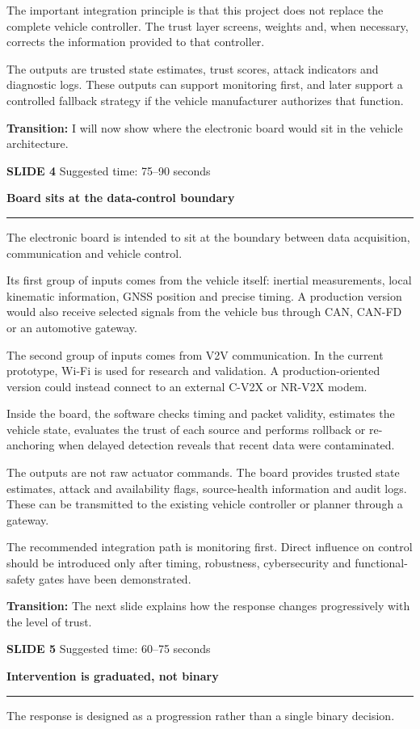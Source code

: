 \documentclass[11pt,a4paper]{article}
\newcommand{\slidetitle}[3]{%
  \clearpage
  {\color{Accent}\large\bfseries SLIDE #1}\hfill
  {\color{Muted}\small Suggested time: #3}\par
  \vspace{0.18cm}
  {\LARGE\bfseries #2}\par
  \vspace{0.20cm}
  {\color{Muted}\rule{\textwidth}{0.5pt}}\par
  \vspace{0.12cm}
}
\newcommand{\transition}[1]{%
  \vfill
  \colorbox{Panel}{%
    \parbox{\dimexpr\textwidth-2\fboxsep\relax}{%
      \raggedright\textbf{Transition:} #1}}
}
\begin{document}
The important integration principle is that this project does not replace the complete vehicle controller. The trust layer screens, weights and, when necessary, corrects the information provided to that controller.

The outputs are trusted state estimates, trust scores, attack indicators and diagnostic logs. These outputs can support monitoring first, and later support a controlled fallback strategy if the vehicle manufacturer authorizes that function.

\transition{I will now show where the electronic board would sit in the vehicle architecture.}

\slidetitle{4}{Board sits at the data-control boundary}{75--90 seconds}

The electronic board is intended to sit at the boundary between data acquisition, communication and vehicle control.

Its first group of inputs comes from the vehicle itself: inertial measurements, local kinematic information, GNSS position and precise timing. A production version would also receive selected signals from the vehicle bus through CAN, CAN-FD or an automotive gateway.

The second group of inputs comes from V2V communication. In the current prototype, Wi-Fi is used for research and validation. A production-oriented version could instead connect to an external C-V2X or NR-V2X modem.

Inside the board, the software checks timing and packet validity, estimates the vehicle state, evaluates the trust of each source and performs rollback or re-anchoring when delayed detection reveals that recent data were contaminated.

The outputs are not raw actuator commands. The board provides trusted state estimates, attack and availability flags, source-health information and audit logs. These can be transmitted to the existing vehicle controller or planner through a gateway.

The recommended integration path is monitoring first. Direct influence on control should be introduced only after timing, robustness, cybersecurity and functional-safety gates have been demonstrated.

\transition{The next slide explains how the response changes progressively with the level of trust.}

\slidetitle{5}{Intervention is graduated, not binary}{60--75 seconds}

The response is designed as a progression rather than a single binary decision.
\end{document}

